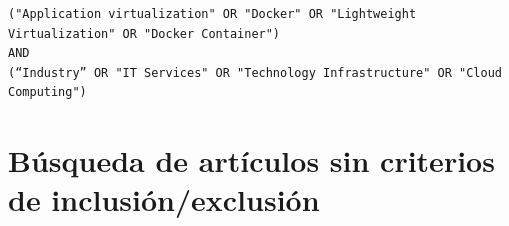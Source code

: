 \begin{tcolorbox}[
  colback=gray!5, 
  colframe=black!60, 
  title=Cadena de búsqueda en Taylor \& Francis para extensión, 
  fonttitle=\bfseries, 
  sharp corners=south
]
\scriptsize %
\begin{verbatim}
("Application virtualization" OR "Docker" OR "Lightweight Virtualization" OR "Docker Container")  
AND 
(“Industry” OR "IT Services" OR "Technology Infrastructure" OR "Cloud Computing")
\end{verbatim}
\end{tcolorbox}


\section{Búsqueda de artículos sin criterios de inclusión/exclusión}

